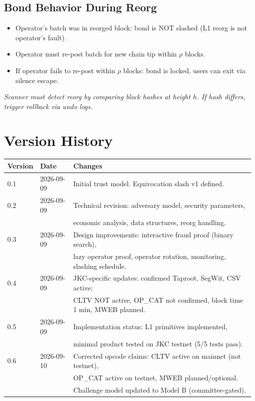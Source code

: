 \documentclass[a4paper,11pt]{article}
\begin{document}
\subsection{Bond Behavior During Reorg}

\begin{itemize}[nosep]
    \item Operator's batch was in reorged block: bond is NOT slashed (L1 reorg is not operator's fault).
    \item Operator must re-post batch for new chain tip within $\rho$ blocks.
    \item If operator fails to re-post within $\rho$ blocks: bond is locked, users can exit via silence escape.
\end{itemize}

\noindent\textit{Scanner must detect reorg by comparing block hashes at height $h$. If hash differs, trigger rollback via undo logs.}

\section{Version History}

\begin{tabular}{lll}
\toprule
\textbf{Version} & \textbf{Date} & \textbf{Changes} \\
\midrule
0.1 & 2026-09-09 & Initial trust model. Equivocation slash v1 defined. \\
0.2 & 2026-09-09 & Technical revision: adversary model, security parameters, \\
  &  & economic analysis, data structures, reorg handling. \\
0.3 & 2026-09-09 & Design improvements: interactive fraud proof (binary search), \\
  &  & lazy operator proof, operator rotation, monitoring, slashing schedule. \\
0.4 & 2026-09-09 & JKC-specific updates: confirmed Taproot, SegWit, CSV active; \\
  &  & CLTV NOT active, OP\_CAT not confirmed, block time 1 min, MWEB planned. \\
0.5 & 2026-09-09 & Implementation status: L1 primitives implemented, \\
  &  & minimal product tested on JKC testnet (5/5 tests pass). \\
0.6 & 2026-09-10 & Corrected opcode claims: CLTV active on mainnet (not testnet), \\
  &  & OP\_CAT active on testnet, MWEB planned/optional. \\
  &  & Challenge model updated to Model B (committee-gated). \\
\bottomrule
\end{tabular}
\end{document}
